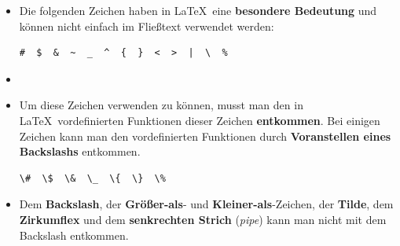 \begin{frame}[fragile]

\begin{itemize}
	
	\item Die folgenden Zeichen haben in \LaTeX\ eine \textbf{besondere Bedeutung} und können nicht einfach im Fließtext verwendet werden:
	
\begin{lstlisting}
#  $  &  ~  _  ^  {  }  <  >  |  \  %
\end{lstlisting}

	\item[]

\pause

	\item Um diese Zeichen verwenden zu können, musst man den in \LaTeX\ vordefinierten Funktionen dieser Zeichen \textbf{entkommen}. Bei einigen Zeichen kann man den vordefinierten Funktionen durch \textbf{Voranstellen eines Backslashs} entkommen. 

\begin{lstlisting}
\#  \$  \&  \_  \{  \}  \%
\end{lstlisting}
	
\end{itemize}

\end{frame}


\begin{frame}[fragile]

\begin{itemize}

	\item Dem \textbf{Backslash}, der \textbf{Größer-als}- und \textbf{Kleiner-als}-Zeichen, der \textbf{Tilde}, dem \textbf{Zirkumflex} und dem \textbf{senkrechten Strich} (\emph{pipe}) kann man nicht mit dem Backslash entkommen.

\end{itemize}

\end{frame}


